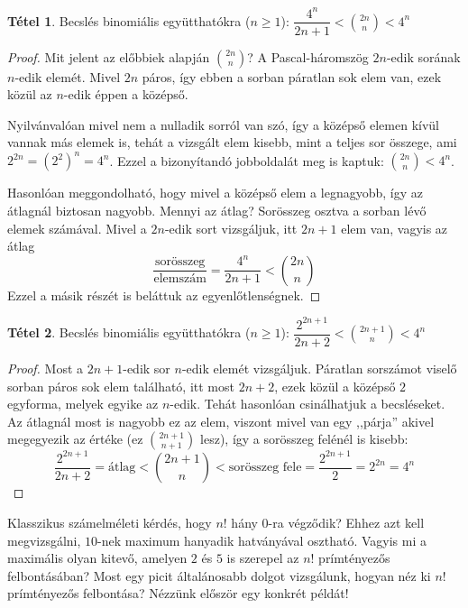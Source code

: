 \documentclass[12pt]{book}
\theoremstyle{plain} %
\theoremstyle{definition} %
\newtheorem{theo/}{Tétel}[section]
\newenvironment{theo}
  {\renewcommand{\qedsymbol}{$\clubsuit$}%
   \pushQED{\qed}\begin{theo/}}
  {\popQED\end{theo/}}
\theoremstyle{remark}
\renewcommand\qedsymbol{$\blacksquare$}
\numberwithin{equation}{section}  %
\begin{document}
	\hrulefill
	
	\begin{theo}\label{first}
		Becslés binomiális együtthatókra ($n\geq 1$): $ \displaystyle \dfrac{4^n}{2n+1} < {2n  \choose n} < 4^n $
	\end{theo}

	\begin{proof}
		Mit jelent az előbbiek alapján ${2n\choose n}$? A Pascal-háromszög $2n$-edik sorának $n$-edik elemét. Mivel $2n$ páros, így ebben a sorban páratlan sok elem van, ezek közül az $n$-edik éppen a középső.
		
		Nyilvánvalóan mivel nem a nulladik sorról van szó, így a középső elemen kívül vannak más elemek is, tehát a vizsgált elem kisebb, mint a teljes sor összege, ami $2^{2n} = (2^2)^n = 4^n$. Ezzel a bizonyítandó jobboldalát meg is kaptuk: ${2n\choose n} < 4^n$.
		
		Hasonlóan meggondolható, hogy mivel a középső elem a legnagyobb, így az átlagnál biztosan nagyobb. Mennyi az átlag? Sorösszeg osztva a sorban lévő elemek számával. Mivel a $2n$-edik sort vizsgáljuk, itt $2n+1$ elem van, vagyis az átlag
		\[ \dfrac{\text{sorösszeg}}{\text{elemszám}} = \dfrac{4^n}{2n+1} < {2n\choose n}  \]
		Ezzel a másik részét is beláttuk az egyenlőtlenségnek.
	\end{proof}

	\begin{theo}\label{2n+1choosen}
		Becslés binomiális együtthatókra ($n\geq 1$): $\displaystyle \dfrac{2^{2n+1}}{2n+2} < {2n+1 \choose n} < 4^n $
	\end{theo}

	\begin{proof}
		Most a $2n+1$-edik sor $n$-edik elemét vizsgáljuk. Páratlan sorszámot viselő sorban páros sok elem található, itt most $2n+2$, ezek közül a középső $2$ egyforma, melyek egyike az $n$-edik. Tehát hasonlóan csinálhatjuk a becsléseket. Az átlagnál most is nagyobb ez az elem, viszont mivel van egy ,,párja'' akivel megegyezik az értéke (ez ${2n+1\choose n+1}$ lesz), így a sorösszeg felénél is kisebb:
		\[ \dfrac{2^{2n+1}}{2n+2} = \text{átlag} < {2n+1\choose n} < \text{sorösszeg fele} = \dfrac{2^{2n+1}}{2} = 2^{2n} = 4^n \]
	\end{proof}

	Klasszikus számelméleti kérdés, hogy $n!$ hány $0$-ra végződik? Ehhez azt kell megvizsgálni, $10$-nek maximum hanyadik hatványával osztható. Vagyis mi a maximális olyan kitevő, amelyen $2$ és $5$ is szerepel az $n!$ prímtényezős felbontásában? Most egy picit általánosabb dolgot vizsgálunk, hogyan néz ki $n!$ prímtényezős felbontása? Nézzünk először egy konkrét példát!
	
\end{document}
